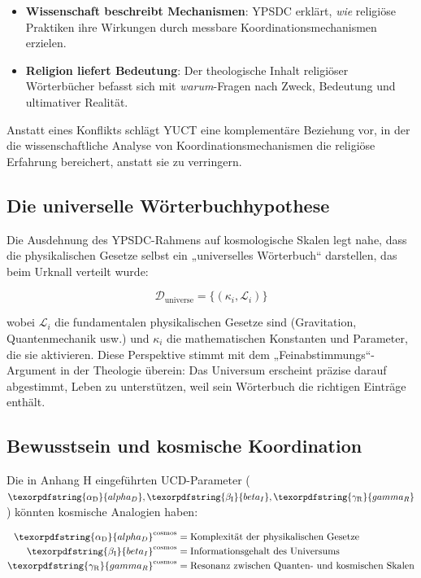 \documentclass[12pt,a4paper]{article}
\DeclareRobustCommand{\alD}{\texorpdfstring{\ensuremath{\alpha_{\mathrm{D}}}}{alpha_D}}
\DeclareRobustCommand{\beI}{\texorpdfstring{\ensuremath{\beta_{\mathrm{I}}}}{beta_I}}
\DeclareRobustCommand{\gaR}{\texorpdfstring{\ensuremath{\gamma_{\mathrm{R}}}}{gamma_R}}
\begin{document}
	\begin{itemize}
		\item \textbf{Wissenschaft beschreibt Mechanismen}: YPSDC erklärt, \textit{wie} religiöse Praktiken ihre Wirkungen durch messbare Koordinationsmechanismen erzielen.
		
		\item \textbf{Religion liefert Bedeutung}: Der theologische Inhalt religiöser Wörterbücher befasst sich mit \textit{warum}-Fragen nach Zweck, Bedeutung und ultimativer Realität.
	\end{itemize}
	
	Anstatt eines Konflikts schlägt YUCT eine komplementäre Beziehung vor, in der die wissenschaftliche Analyse von Koordinationsmechanismen die religiöse Erfahrung bereichert, anstatt sie zu verringern.
	
	\subsection{Die universelle Wörterbuchhypothese}
	
	Die Ausdehnung des YPSDC-Rahmens auf kosmologische Skalen legt nahe, dass die physikalischen Gesetze selbst ein „universelles Wörterbuch“ darstellen, das beim Urknall verteilt wurde:
	
	\[
	\mathcal{D}_{\mathrm{universe}} = \{ (\kappa_i, \mathcal{L}_i) \}
	\]
	
	wobei $\mathcal{L}_i$ die fundamentalen physikalischen Gesetze sind (Gravitation, Quantenmechanik usw.) und $\kappa_i$ die mathematischen Konstanten und Parameter, die sie aktivieren. Diese Perspektive stimmt mit dem „Feinabstimmungs“-Argument in der Theologie überein: Das Universum erscheint präzise darauf abgestimmt, Leben zu unterstützen, weil sein Wörterbuch die richtigen Einträge enthält.
	
	\subsection{Bewusstsein und kosmische Koordination}
	
	Die in Anhang H eingeführten UCD-Parameter ($\alD, \beI, \gaR$) könnten kosmische Analogien haben:
	
	\begin{align*}
		\alD^{\mathrm{cosmos}} &= \text{Komplexität der physikalischen Gesetze} \\
		\beI^{\mathrm{cosmos}} &= \text{Informationsgehalt des Universums} \\
		\gaR^{\mathrm{cosmos}} &= \text{Resonanz zwischen Quanten- und kosmischen Skalen}
	\end{align*}
	
\end{document}
